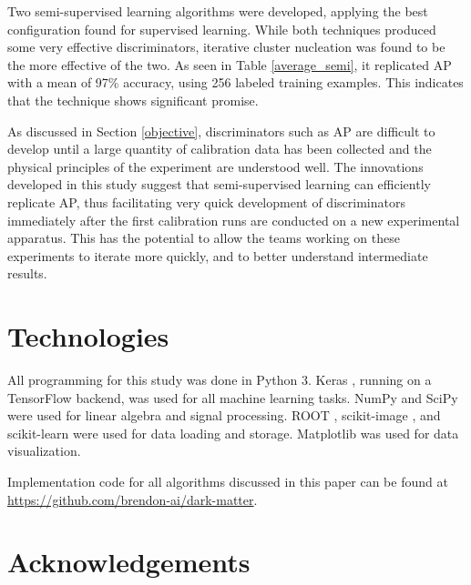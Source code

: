 \documentclass[10pt]{article}
\begin{document}
Two semi-supervised learning algorithms were developed, applying the best configuration found for supervised learning. While both techniques produced some very effective discriminators, iterative cluster nucleation was found to be the more effective of the two. As seen in Table \ref{average_semi}, it replicated AP with a mean of 97\% accuracy, using 256 labeled training examples. This indicates that the technique shows significant promise.

As discussed in Section \ref{objective}, discriminators such as AP are difficult to develop until a large quantity of calibration data has been collected and the physical principles of the experiment are understood well. The innovations developed in this study suggest that semi-supervised learning can efficiently replicate AP, thus facilitating very quick development of discriminators immediately after the first calibration runs are conducted on a new experimental apparatus. This has the potential to allow the teams working on these experiments to iterate more quickly, and to better understand intermediate results.

\section{Technologies}

All programming for this study was done in Python 3. Keras \cite{keras}, running on a TensorFlow \cite{tensorflow} backend, was used for all machine learning tasks. NumPy \cite{numpy} and SciPy \cite{scipy} were used for linear algebra and signal processing. ROOT \cite{root}, scikit-image \cite{scikit-image}, and scikit-learn \cite{scikit-learn} were used for data loading and storage. Matplotlib \cite{matplotlib} was used for data visualization.

Implementation code for all algorithms discussed in this paper can be found at \url{https://github.com/brendon-ai/dark-matter}.

\section{Acknowledgements}
\end{document}
